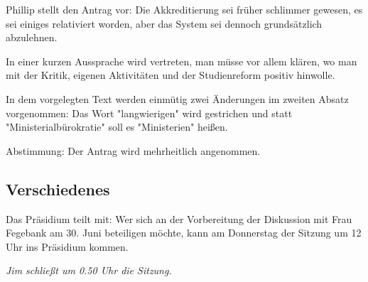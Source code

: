 \documentclass[ngerman,headheight=70pt]{scrartcl}
\begin{document}
    Phillip stellt den Antrag vor: Die Akkreditierung sei früher schlimmer gewesen,
    es sei einiges relativiert worden, aber das System sei dennoch grundsätzlich
    abzulehnen.

    In einer kurzen Aussprache wird vertreten, man müsse vor allem klären, wo
    man mit der Kritik, eigenen Aktivitäten und der Studienreform positiv
    hinwolle.

    In dem vorgelegten Text werden einmütig zwei Änderungen im zweiten Absatz
    vorgenommen: Das Wort "langwierigen" wird gestrichen und statt
    "Ministerialbürokratie" soll es "Ministerien" heißen.

    Abstimmung: Der Antrag wird mehrheitlich angenommen.

    \subsection{Verschiedenes}

    Das Präsidium teilt mit: Wer sich an der Vorbereitung der Diskussion mit
    Frau Fegebank am 30. Juni beteiligen möchte, kann am Donnerstag der Sitzung
    um 12 Uhr ins Präsidium kommen.

    \textit{Jim schließt um 0.50 Uhr die Sitzung.}
\end{document}
